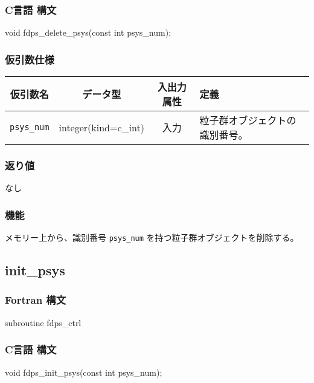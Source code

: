 \subsubsection*{C言語 構文}
\begin{screen}
\begin{spverbatim}
void fdps_delete_psys(const int psys_num);
\end{spverbatim}
\end{screen}

\subsubsection*{仮引数仕様}
\begin{table}[h]
\begin{tabularx}{\linewidth}{cccX}
\toprule
\rowcolor{Snow2}
仮引数名 & データ型 & 入出力属性 & 定義 \\
\midrule
\texttt{psys\_num} & integer(kind=c\_int) & 入力 & 粒子群オブジェクトの識別番号。\\
\bottomrule
\end{tabularx}
\end{table}

\subsubsection*{返り値}
なし

\subsubsection*{機能}
メモリー上から、識別番号 \texttt{psys\_num} を持つ粒子群オブジェクトを削除する。

\clearpage

\subsection{init\_psys}
\subsubsection*{Fortran 構文}
\begin{screen}
\begin{spverbatim}
subroutine fdps_ctrl%
\end{spverbatim}
\end{screen}

\subsubsection*{C言語 構文}
\begin{screen}
\begin{spverbatim}
void fdps_init_psys(const int psys_num);
\end{spverbatim}
\end{screen}


